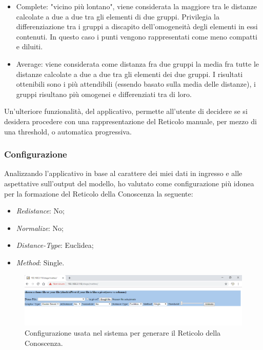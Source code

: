 \begin{itemize}
\begin{itemize}
\item Complete: "vicino pi\`u lontano", viene considerata la maggiore tra le distanze calcolate a due a due tra gli elementi di due gruppi. Privilegia la differenziazione tra i gruppi a discapito dell'omogeneit\`a degli elementi in essi contenuti. In questo caso i punti vengono rappresentati come meno compatti e diluiti.
\item Average: viene considerata come distanza fra due gruppi la media fra tutte le distanze calcolate a due a due tra gli elementi dei due gruppi. I risultati ottenibili sono i pi\`u attendibili (essendo basato sulla media delle distanze), i gruppi risultano pi\`u omogenei e differenziati tra di loro.
\end{itemize}
\end{itemize}
\noindent
Un'ulteriore funzionalit\`a, del applicativo, permette all'utente di decidere se si desidera procedere con una rappresentazione del Reticolo manuale, per mezzo di una threshold, o automatica progressiva.

\subsubsection{Configurazione}
\label{configurazione}
Analizzando l'applicativo in base al carattere dei miei dati in ingresso e alle aspettative sull'output del modello, ho valutato come configurazione pi\`u idonea per la formazione del Reticolo della Conoscenza la seguente:
\begin{itemize}
\item \textit{Redistance}: No;
\item  \textit{Normalize}: No;
\item \textit{Distance-Type}: Euclidea;
\item \textit{Method}: Single.
\end{itemize}
\noindent
\begin{figure}[H]
\centering
	\includegraphics[width=1\linewidth]{./image/img-configurazione_reticolo.png}
	\caption{Configurazione usata nel sistema per generare il Reticolo della Conoscenza.}
	\label{Configurazione usata nel sistema per generare il Reticolo della Conoscenza.}
\end{figure}
\noindent

